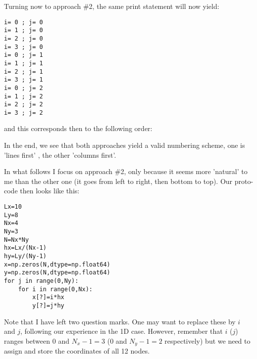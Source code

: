 Turning now to approach \#2, the same print statement will now yield:
\begin{lstlisting}
i= 0 ; j= 0
i= 1 ; j= 0
i= 2 ; j= 0
i= 3 ; j= 0
i= 0 ; j= 1
i= 1 ; j= 1
i= 2 ; j= 1
i= 3 ; j= 1
i= 0 ; j= 2
i= 1 ; j= 2
i= 2 ; j= 2
i= 3 ; j= 2
\end{lstlisting}
and this corresponds then to the following order: 
\begin{center}
\end{center}

\noindent In the end, we see that both approaches yield a valid 
numbering scheme, one is 'lines first' , the other 'columns first'.

In what follows I focus on approach \#2, only because it seems more 'natural' to me than the other one (it goes from left to right, then bottom to top). 
Our proto-code then looks like this:
\begin{lstlisting}
Lx=10
Ly=8
Nx=4
Ny=3
N=Nx*Ny
hx=Lx/(Nx-1)
hy=Ly/(Ny-1)
x=np.zeros(N,dtype=np.float64)
y=np.zeros(N,dtype=np.float64)
for j in range(0,Ny):
    for i in range(0,Nx):
        x[?]=i*hx
        y[?]=j*hy
\end{lstlisting}
Note that I have left two question marks. One may want to replace these by $i$ and $j$, 
following our experience in the 1D case. However, remember that $i$ ($j$) ranges between 
$0$ and $N_x-1=3$ ($0$ and $N_y-1=2$ respectively) but we need to assign and store the 
coordinates of all 12 nodes. 

